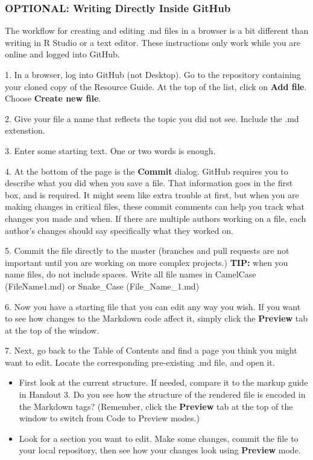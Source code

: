 \documentclass[
]{article}
\providecommand{\tightlist}{%
  \setlength{\itemsep}{0pt}\setlength{\parskip}{0pt}}
\begin{document}
\hypertarget{optional-writing-directly-inside-github}{%
\subsubsection{OPTIONAL: Writing Directly Inside
GitHub}\label{optional-writing-directly-inside-github}}

The workflow for creating and editing .md files in a browser is a bit
different than writing in R Studio or a text editor. These instructions
only work while you are online and logged into GitHub.

1. In a browser, log into GitHub (not Desktop). Go to the repository
containing your cloned copy of the Resource Guide. At the top of the
list, click on \textbf{Add file}. Choose \textbf{Create new file}.

2. Give your file a name that reflects the topic you did not see.
Include the .md extenstion.

3. Enter some starting text. One or two words is enough.

4. At the bottom of the page is the \textbf{Commit} dialog. GitHub
requires you to describe what you did when you save a file. That
information goes in the first box, and is required. It might seem like
extra trouble at first, but when you are making changes in critical
files, these commit comments can help you track what changes you made
and when. If there are multiple authors working on a file, each author's
changes should say specifically what they worked on.

5. Commit the file directly to the master (branches and pull requests
are not important until you are working on more complex projects.)
\textbf{TIP:} when you name files, do not include spaces. Write all file
names in CamelCase (FileName1.md) or Snake\_Case (File\_Name\_1.md)

6. Now you have a starting file that you can edit any way you wish. If
you want to see how changes to the Markdown code affect it, simply click
the \textbf{Preview} tab at the top of the window.

7. Next, go back to the Table of Contents and find a page you think you
might want to edit. Locate the corresponding pre-existing .md file, and
open it.

\begin{itemize}
\tightlist
\item
  First look at the current structure. If needed, compare it to the
  markup guide in Handout 3. Do you see how the structure of the
  rendered file is encoded in the Markdown tags? (Remember, click the
  \textbf{Preview} tab at the top of the window to switch from Code to
  Preview modes.)
\item
  Look for a section you want to edit. Make some changes, commit the
  file to your local repository, then see how your changes look using
  \textbf{Preview} mode.
\end{itemize}
\end{document}
